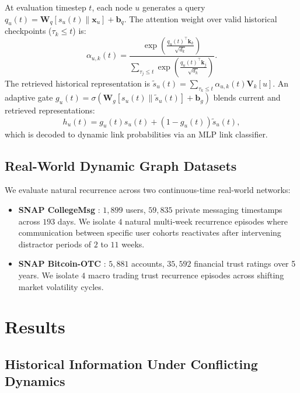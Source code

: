 \documentclass[10pt,twocolumn,letterpaper]{article}
\begin{document}
At evaluation timestep $t$, each node $u$ generates a query $q_u(t) = \mathbf{W}_q [s_u(t) \parallel \mathbf{x}_u] + \mathbf{b}_q$. The attention weight over valid historical checkpoints ($\tau_k \le t$) is:
\begin{equation}
    \alpha_{u,k}(t) = \frac{\exp\left(\frac{q_u(t)^\top \mathbf{k}_k}{\sqrt{d_k}}\right)}{\sum_{\tau_j \le t} \exp\left(\frac{q_u(t)^\top \mathbf{k}_j}{\sqrt{d_k}}\right)}.
\end{equation}
The retrieved historical representation is $\tilde{s}_u(t) = \sum_{\tau_k \le t} \alpha_{u,k}(t) \mathbf{V}_k[u]$. An adaptive gate $g_u(t) = \sigma(\mathbf{W}_g [s_u(t) \parallel \tilde{s}_u(t)] + \mathbf{b}_g)$ blends current and retrieved representations:
\begin{equation}
    h_u(t) = g_u(t) s_u(t) + (1 - g_u(t)) \tilde{s}_u(t),
\end{equation}
which is decoded to dynamic link probabilities via an MLP link classifier.

\subsection{Real-World Dynamic Graph Datasets}
We evaluate natural recurrence across two continuous-time real-world networks:
\begin{itemize}
    \item \textbf{SNAP CollegeMsg} \citep{panzarasa2009patterns}: $1,899$ users, $59,835$ private messaging timestamps across $193$ days. We isolate $4$ natural multi-week recurrence episodes where communication between specific user cohorts reactivates after intervening distractor periods of $2$ to $11$ weeks.
    \item \textbf{SNAP Bitcoin-OTC} \citep{kumar2016edge}: $5,881$ accounts, $35,592$ financial trust ratings over 5 years. We isolate $4$ macro trading trust recurrence episodes across shifting market volatility cycles.
\end{itemize}

\section{Results}
\label{sec:results}

\subsection{Historical Information Under Conflicting Dynamics}
\label{sec:results_tb}
\end{document}
